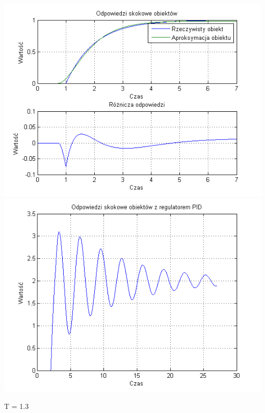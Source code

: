 \documentclass[10pt,a4paper]{article}
\begin{document}
\begin{center}
\includegraphics[scale=1]{images/dwa/skrypt_15.png}\\
\includegraphics[scale=1]{images/dwa/skrypt_16.png}\\
\end{center}
\newpage
T = 1.3
\end{document}
